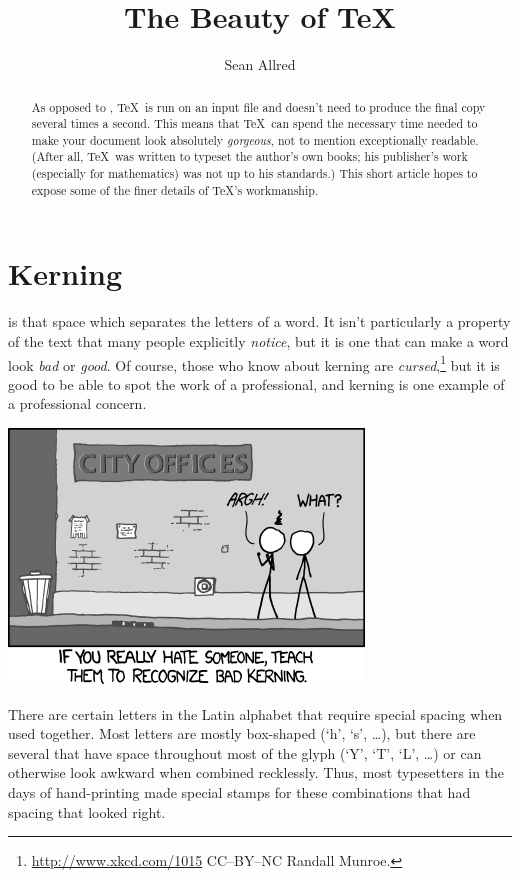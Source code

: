 \documentclass[draft]{article}
\title{The Beauty of \TeX}
\author{Sean Allred}
\begin{document}
\maketitle

\begin{abstract}
As opposed to \MicrosoftWord,
  \TeX\ is run on an input file and
  doesn't need to produce the final copy
  several times a second.
This means that \TeX\ can spend
  the necessary time needed
  to make your document
  look absolutely \emph{gorgeous},
  not to mention exceptionally readable.
(After all, \TeX\ was written to typeset the author's own books;
 his publisher's work (especially for mathematics) was not up to his standards.)
This short article hopes
  to expose some of the finer details
  of \TeX's workmanship.
\end{abstract}
\vfil
\tableofcontents
\newpage

\section{Kerning}
\label{sec:kerning}

 is that space which separates the letters of a word.
It isn't particularly a property of the text that many people explicitly \emph{notice},
  but it is one that can make a word look \emph{bad} or \emph{good}.
Of course, those who know about kerning are \emph{cursed},\footnote{%
  \url{http://www.xkcd.com/1015} CC--BY--NC Randall Munroe.}
  but it is good to be able to spot the work of a professional,
  and kerning is one example of a professional concern.

\begin{center}
  \includegraphics[width=.5\linewidth]{xkcd-kerning}
\end{center}

\noindent
There are certain letters in the Latin alphabet that
  require special spacing when used together.
Most letters are mostly box-shaped (`h', `s', \dots),
  but there are several that have space
  throughout most of the glyph (`Y', `T', `L', \dots)
  or can otherwise look awkward when combined recklessly.
Thus, most typesetters in the days of hand-printing
  made special stamps for these combinations
  that had spacing that looked right.
\end{document}
